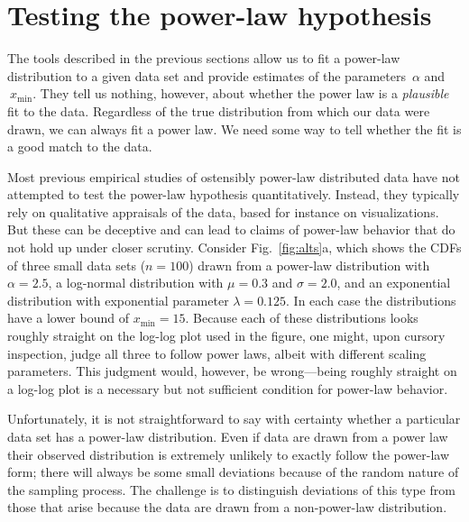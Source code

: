 \documentclass[final]{siamltex}
\newcommand{\xmin}{\ensuremath{x_{\min}}}
\begin{document}
\section{Testing the power-law hypothesis}
\label{sec:hypothesis}

The tools described in the previous sections allow us to fit a power-law
distribution to a given data set and provide estimates of the
parameters~$\alpha$ and$~\xmin$.  They tell us nothing, however, about
whether the power law is a \emph{plausible} fit to the data.  Regardless of
the true distribution from which our data were drawn, we can always fit a
power law.  We need some way to tell whether the fit is a good match to the
data.

Most previous empirical studies of ostensibly power-law distributed data
have not attempted to test the power-law hypothesis quantitatively.
Instead, they typically rely on qualitative appraisals of the data, based
for instance on visualizations.  But these can be deceptive and can lead to
claims of power-law behavior that do not hold up under closer scrutiny.
Consider Fig.~\ref{fig:alts}a, which shows the CDFs of three small data
sets ($n=100$) drawn from a power-law distribution with $\alpha=2.5$, a
log-normal distribution with $\mu=0.3$ and $\sigma=2.0$, and an exponential
distribution with exponential parameter $\lambda=0.125$.  In each case the
distributions have a lower bound of $\xmin=15$.  Because each of these
distributions looks roughly straight on the log-log plot used in the
figure, one might, upon cursory inspection, judge all three to follow power
laws, albeit with different scaling parameters.  This judgment would,
however, be wrong---being roughly straight on a log-log plot is a necessary
but not sufficient condition for power-law behavior.

Unfortunately, it is not straightforward to say with certainty whether a
particular data set has a power-law distribution.  Even if data are drawn
from a power law their observed distribution is extremely unlikely to
exactly follow the power-law form; there will always be some small
deviations because of the random nature of the sampling process.  The
challenge is to distinguish deviations of this type from those that arise
because the data are drawn from a non-power-law distribution.
\end{document}
